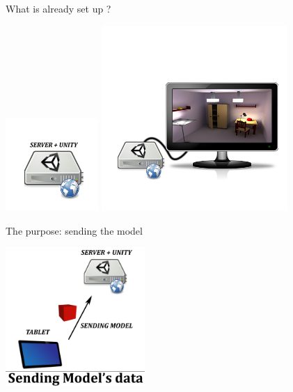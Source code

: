 \documentclass[a4paper,10pt]{beamer}
\begin{document}
			\begin{frame}{What is already set up ?}
					\centerline{\includegraphics[height=100pt]{images/network/server.png}
					\pause
					\includegraphics[height=200pt]{images/network/scenebefore.png}}
			\end{frame}
			
			\begin{frame}{The purpose: sending the model}
				\centerline{\includegraphics[height=150pt]{images/network/sending_model.png}}
			\end{frame}
			
\end{document}
